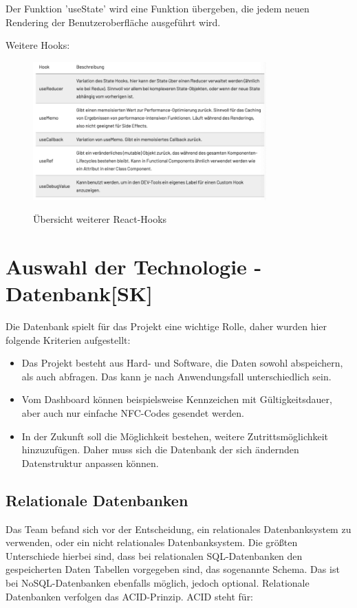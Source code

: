 Der Funktion 'useState' wird eine Funktion übergeben, die jedem neuen Rendering der Benutzeroberfläche ausgeführt wird.

Weitere Hooks: 
\\
\begin{figure}[H]
  \centering
  \includegraphics[width=0.8\textwidth]{pics/rHooks.png}
  \caption{Übersicht weiterer React-Hooks}
  \cite{hooks}
\end{figure}

\section{Auswahl der Technologie - Datenbank[SK]}
Die Datenbank spielt für das Projekt eine wichtige Rolle, daher wurden hier folgende Kriterien aufgestellt:

\begin{itemize}
  \item Das Projekt besteht aus Hard- und Software, die Daten sowohl abspeichern, als auch abfragen. Das kann je nach Anwendungsfall unterschiedlich sein.
  \item Vom Dashboard können beispielsweise Kennzeichen mit Gültigkeitsdauer, aber auch nur einfache NFC-Codes gesendet werden.
  \item In der Zukunft soll die Möglichkeit bestehen, weitere Zutrittsmöglichkeit hinzuzufügen. Daher muss sich die Datenbank der sich ändernden Datenstruktur anpassen können.
\end{itemize}

\subsection{Relationale Datenbanken}

Das Team befand sich vor der Entscheidung, ein relationales Datenbanksystem zu verwenden, oder ein nicht relationales Datenbanksystem.
Die größten Unterschiede hierbei sind, dass bei relationalen SQL-Datenbanken den gespeicherten Daten Tabellen vorgegeben sind, das sogenannte Schema. Das ist bei NoSQL-Datenbanken ebenfalls möglich, jedoch optional.
Relationale Datenbanken verfolgen das ACID-Prinzip. ACID steht für: \\

